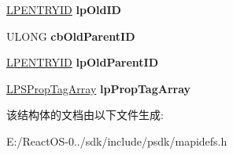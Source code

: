 \begin{DoxyCompactItemize}
\hyperlink{struct___e_n_t_r_y_i_d}{L\+P\+E\+N\+T\+R\+Y\+ID} {\bfseries lp\+Old\+ID}
\item 
\mbox{\label{struct___o_b_j_e_c_t___n_o_t_i_f_i_c_a_t_i_o_n_ab96b8517a9bc148b42414c312a91f074}} 
U\+L\+O\+NG {\bfseries cb\+Old\+Parent\+ID}
\item 
\mbox{\label{struct___o_b_j_e_c_t___n_o_t_i_f_i_c_a_t_i_o_n_a3452f30a60c8eae32b34d0dceb094543}} 
\hyperlink{struct___e_n_t_r_y_i_d}{L\+P\+E\+N\+T\+R\+Y\+ID} {\bfseries lp\+Old\+Parent\+ID}
\item 
\mbox{\label{struct___o_b_j_e_c_t___n_o_t_i_f_i_c_a_t_i_o_n_a7deeef7ec49475c7317938aeeade8af7}} 
\hyperlink{struct___s_prop_tag_array}{L\+P\+S\+Prop\+Tag\+Array} {\bfseries lp\+Prop\+Tag\+Array}
\end{DoxyCompactItemize}


该结构体的文档由以下文件生成\+:\begin{DoxyCompactItemize}
\item 
E\+:/\+React\+O\+S-\/0../sdk/include/psdk/mapidefs.\+h\end{DoxyCompactItemize}

